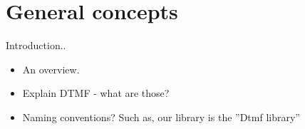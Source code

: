 \chapter{General concepts}
Introduction..
\begin{itemize}
 \item An overview.
 \item Explain DTMF - what are those?
 \item Naming conventions? Such as, our library is the ''Dtmf library''
\end{itemize}

